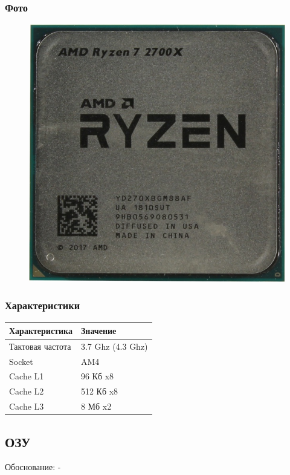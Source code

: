 \documentclass[a4paper]{article}
\begin{document}
\subsubsection{Фото}
\begin{figure}[H]
\centering
\includegraphics[scale=0.3]{cpu.jpg} 
\end{figure}

\subsubsection{Характеристики}
\begin{table}[H]
\centering
\begin{tabular}{|l|l|}
    \hline
    Характеристика & Значение \\
    \hline
    Тактовая частота & 3.7 Ghz (4.3 Ghz) \\
    Socket & AM4 \\ 
    Cache L1 & 96 Кб x8 \\
    Cache L2 & 512 Кб x8 \\
    Cache L3 & 8 Мб x2 \\
    \hline
\end{tabular}
\end{table}

\subsection{ОЗУ}
Обоснование: -
\end{document}
